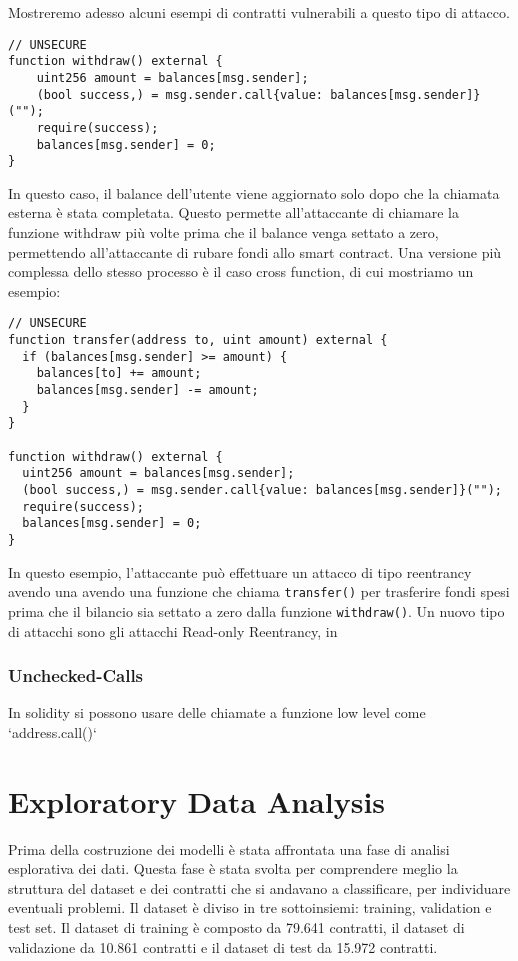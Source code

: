 \documentclass[../../Thesis.tex]{subfiles}
\begin{document}
Mostreremo adesso alcuni esempi di contratti vulnerabili a questo tipo di attacco. 
\begin{lstlisting}[language=Solidity]
// UNSECURE
function withdraw() external {
    uint256 amount = balances[msg.sender];
    (bool success,) = msg.sender.call{value: balances[msg.sender]}("");
    require(success);
    balances[msg.sender] = 0;
}
\end{lstlisting}
In questo caso, il balance dell'utente viene aggiornato solo dopo che la chiamata esterna è stata completata. Questo permette all'attaccante di chiamare la funzione withdraw più volte prima che il balance venga settato a zero, permettendo all'attaccante di rubare fondi allo smart contract.
Una versione più complessa dello stesso processo è il caso cross function, di cui mostriamo un esempio:
\begin{lstlisting}[language=Solidity]
    // UNSECURE
function transfer(address to, uint amount) external {
  if (balances[msg.sender] >= amount) {
    balances[to] += amount;
    balances[msg.sender] -= amount;
  }
}

function withdraw() external {
  uint256 amount = balances[msg.sender];
  (bool success,) = msg.sender.call{value: balances[msg.sender]}("");
  require(success);
  balances[msg.sender] = 0;
}
\end{lstlisting}
In questo esempio, l'attaccante può effettuare un attacco di tipo reentrancy avendo una avendo una funzione che chiama \texttt{transfer()} per trasferire fondi spesi prima che il bilancio sia settato a zero dalla funzione \texttt{withdraw()}.
Un nuovo tipo di attacchi sono gli attacchi Read-only Reentrancy, in 
\subsubsection{Unchecked-Calls}
In solidity si possono usare delle chiamate a funzione low level come `address.call()`



\section{Exploratory Data Analysis}
Prima della costruzione dei modelli è stata affrontata una fase di analisi esplorativa dei dati. Questa fase è stata svolta per comprendere meglio la struttura del dataset e dei contratti che si andavano a classificare, per individuare eventuali problemi. 
Il dataset è diviso in tre sottoinsiemi: training, validation e test set.
Il dataset di training è composto da 79.641 contratti, il dataset di validazione da 10.861 contratti e il dataset di test da 15.972 contratti.
\end{document}
